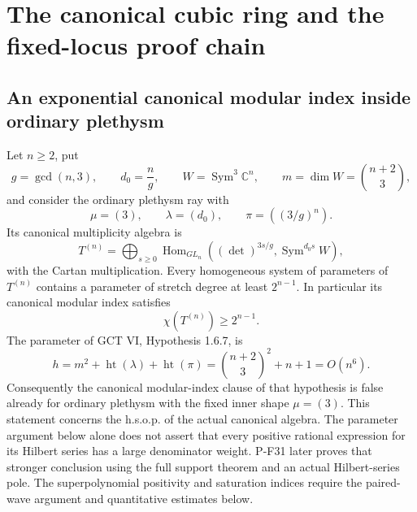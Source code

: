 \section{The canonical cubic ring and the fixed-locus proof chain}


\subsection{An exponential canonical modular index inside ordinary plethysm}

\begin{proposition}
\label{prop:cubiccanonicalcounterexample}
Let $n\ge2$, put
\[
 g=\gcd(n,3),\qquad d_0=\frac ng,\qquad
 W=\operatorname{Sym}^3\mathbb C^n,\qquad
 m=\dim W=\binom{n+2}{3},
\]
and consider the ordinary plethysm ray with
\[
 \mu=(3),\qquad \lambda=(d_0),\qquad
 \pi=((3/g)^n).
 \tag{P-F19a}
\]
Its canonical multiplicity algebra is
\[
 T^{(n)}=\bigoplus_{s\ge0}
  \operatorname{Hom}_{GL_n}
  \left((\det)^{3s/g},\operatorname{Sym}^{d_0s}W\right),
 \tag{P-F19b}
\]
with the Cartan multiplication. Every homogeneous system of parameters
of $T^{(n)}$ contains a parameter of stretch degree at least
$2^{n-1}$. In particular its canonical modular index satisfies
\[
 \chi(T^{(n)})\ge2^{n-1}.
 \tag{P-F19c}
\]
The parameter of GCT VI, Hypothesis 1.6.7, is
\[
 h=m^2+\operatorname{ht}(\lambda)+\operatorname{ht}(\pi)
   =\binom{n+2}{3}^{\!2}+n+1=O(n^6).
 \tag{P-F19d}
\]
Consequently the canonical modular-index clause of that hypothesis
is false already for ordinary plethysm with the fixed inner shape
$\mu=(3)$. This statement concerns the h.s.o.p. of the actual canonical algebra.
The parameter argument below alone does not assert that every positive
rational expression for its Hilbert series has a large denominator
weight. P-F31 later proves that stronger conclusion using the full
support theorem and an actual Hilbert-series pole. The superpolynomial positivity and saturation indices
require the paired-wave argument and quantitative estimates below.
\end{proposition}

